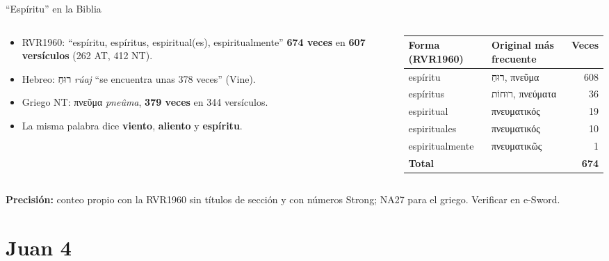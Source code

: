 \documentclass[hyperref={bookmarks=false},aspectratio=169]{beamer}
\newcommand{\heb}[1]{\mbox{\foreignlanguage{hebrew}{#1}}}
\newcommand{\grc}[1]{\foreignlanguage{ancientgreek}{#1}}
\newcommand{\destacar}[1]{\textbf{\textcolor{azul}{#1}}}
\newcommand{\precision}[1]{{\footnotesize\color{gris}\textbf{Precisión:} #1}}
\begin{document}
\begin{frame}{``Espíritu'' en la Biblia}
\begin{columns}[c,onlytextwidth]
\begin{column}{0.40\textwidth}\footnotesize
\begin{itemize}
\item RVR1960: ``espíritu, espíritus, espiritual(es), espiritualmente'' \textbf{674 veces} en \textbf{607 versículos} (262 AT, 412 NT).
\item Hebreo: \heb{רוּחַ} \emph{rúaj} ``se encuentra unas 378 veces'' (Vine).
\item Griego NT: \grc{πνεῦμα} \emph{pneûma}, \textbf{379 veces} en 344 versículos.
\item La misma palabra dice \destacar{viento}, \destacar{aliento} y \destacar{espíritu}.
\end{itemize}
\end{column}
\begin{column}{0.58\textwidth}
\scriptsize\renewcommand{\arraystretch}{1.12}
\begin{tabular}{@{}>{\RaggedRight\arraybackslash}p{3.6cm}>{\RaggedRight\arraybackslash}p{2.4cm}r@{}}
\toprule
\textbf{Forma (RVR1960)} & \textbf{Original más frecuente} & \textbf{Veces} \\ \midrule
espíritu & \heb{רוּחַ}, \grc{πνεῦμα} & 608 \\
espíritus & \heb{רוּחוֹת}, \grc{πνεύματα} & 36 \\
espiritual & \grc{πνευματικός} & 19 \\
espirituales & \grc{πνευματικός} & 10 \\
espiritualmente & \grc{πνευματικῶς} & 1 \\ \midrule
\textbf{Total} & & \textbf{674} \\
\bottomrule
\end{tabular}
\end{column}
\end{columns}\par\smallskip
\precision{conteo propio con la RVR1960 sin títulos de sección y con números Strong; NA27 para el griego. Verificar en e-Sword.}
\end{frame}

\section{Juan 4}
\end{document}
